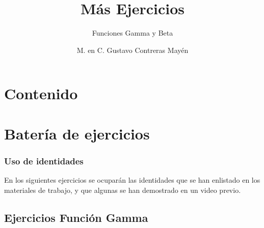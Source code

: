 \documentclass[12pt]{beamer}
\title{\large{Más Ejercicios}}
\subtitle{Funciones Gamma y Beta}
\author{M. en C. Gustavo Contreras Mayén}
\date{}
\institute{Facultad de Ciencias - UNAM}
\begin{document}
\maketitle
\fontsize{14}{14}\selectfont
{}
\section*{Contenido}

\section{Batería de ejercicios}

\begin{frame}
\frametitle{Uso de identidades}
En los siguientes ejercicios se ocuparán las identidades que se han enlistado en los materiales de trabajo, y que algunas se han demostrado en un video previo.
\end{frame}

\subsection{Ejercicios Función Gamma}
\end{document}
